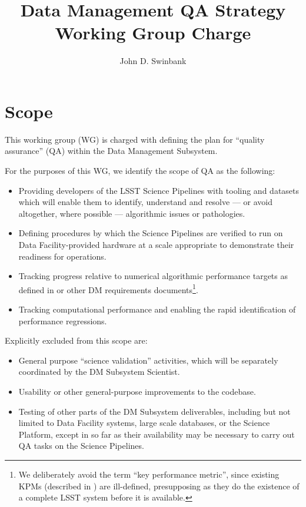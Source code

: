 \documentclass[DM,lsstdraft,toc]{lsstdoc}
\title[DM QA WG]{Data Management QA Strategy Working Group Charge}
\author{John D. Swinbank}
\begin{document}
\maketitle

\section{Scope}

This working group (WG) is charged with defining the plan for ``quality
assurance'' (QA) within the Data Management Subsystem.

For the purposes of this WG, we identify the scope of QA as the following:

\begin{itemize}

  \item{Providing developers of the LSST Science Pipelines with tooling and
  datasets which will enable them to identify, understand and resolve --- or
  avoid altogether, where possible --- algorithmic issues or pathologies.}

  \item{Defining procedures by which the Science Pipelines are verified to run
  on Data Facility-provided hardware at a scale appropriate to demonstrate
  their readiness for operations.}

  \item{Tracking progress relative to numerical algorithmic performance
  targets as defined in  or other DM requirements
  documents\footnote{We deliberately avoid the term ``key performance
  metric'', since existing KPMs (described in ) are
  ill-defined, presupposing as they do the existence of a complete LSST
  system before it is available.}.}

  \item{Tracking computational performance and enabling the rapid
  identification of performance regressions.}

\end{itemize}

Explicitly excluded from this scope are:

\begin{itemize}

  \item{General purpose ``science validation'' activities, which will be
  separately coordinated by the DM Subsystem Scientist.}

  \item{Usability or other general-purpose improvements to the codebase.}

  \item{Testing of other parts of the DM Subsystem deliverables, including but
  not limited to Data Facility systems, large scale databases, or the Science
  Platform, except in so far as their availability may be necessary to carry
  out QA tasks on the Science Pipelines.}

\end{itemize}
\end{document}
